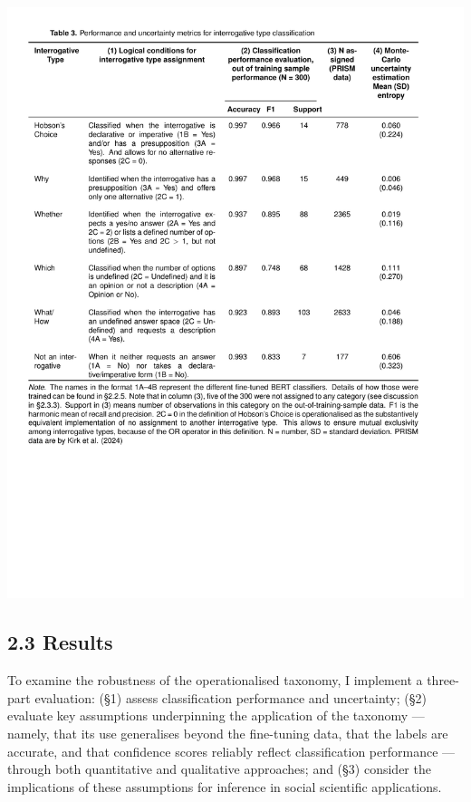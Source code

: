 \documentclass[
  12pt,
]{article}
\begin{document}
\begin{center}\includegraphics{../03_outputs/01_taxonomies_of_interrogatives/table_3} \end{center}

\subsection{2.3 Results}\label{results}

To examine the robustness of the operationalised taxonomy, I implement a three-part evaluation: (§1) assess classification performance and uncertainty; (§2) evaluate key assumptions underpinning the application of the taxonomy --- namely, that its use generalises beyond the fine-tuning data, that the labels are accurate, and that confidence scores reliably reflect classification performance --- through both quantitative and qualitative approaches; and (§3) consider the implications of these assumptions for inference in social scientific applications.
\end{document}
